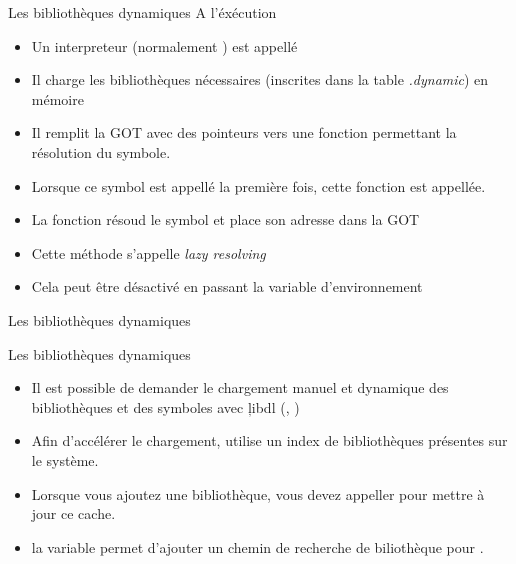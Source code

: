 \begin{frame}[fragile=singleslide]{Les bibliothèques dynamiques}
  A l'éxécution
  \begin{itemize}
  \item Un interpreteur (normalement ) est appellé
  \item  Il charge  les bibliothèques  nécessaires (inscrites  dans la
    table \emph{.dynamic}) en mémoire
  \item  Il  remplit la  GOT  avec  des  pointeurs vers  une  fonction
    permettant la résolution du symbole.
  \item Lorsque ce symbol est appellé la première fois, cette fonction
    est appellée.
  \item La fonction résoud le symbol et place son adresse dans la GOT
  \item Cette méthode s'appelle \emph{lazy resolving}
  \item   Cela   peut   être   désactivé  en   passant   la   variable
    d'environnement 
  \end{itemize}
\end{frame}

\begin{frame}[fragile=singleslide]{Les bibliothèques dynamiques}
  \begin{center}
  \end{center}
\end{frame}

\begin{frame}[fragile=singleslide]{Les bibliothèques dynamiques}
  \begin{itemize}
  \item Il est possible de  demander le chargement manuel et dynamique
    des    bibliothèques    et    des    symboles    avec    \c{libdl}
    (, )
  \item Afin d'accélérer le  chargement,  utilise un index
    de bibliothèques présentes sur le système.
  \item  Lorsque vous  ajoutez une  bibliothèque, vous  devez appeller
     pour mettre à jour ce cache.
  \item la  variable  permet  d'ajouter un chemin
    de recherche de biliothèque pour .
  \end{itemize}
\end{frame}

